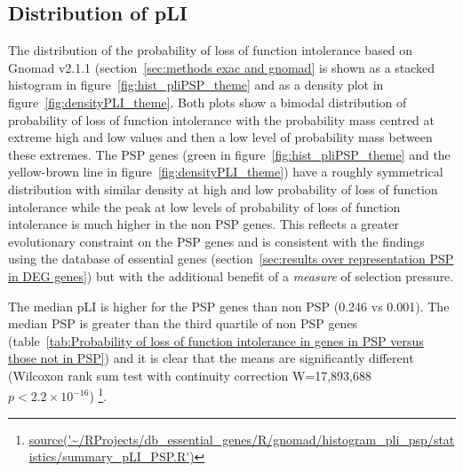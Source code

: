 \subsection{Distribution of pLI}
\label{sec:results distribution of pli}
The distribution of the probability of loss of function intolerance based on Gnomad v2.1.1 (section~\ref{sec:methods exac and gnomad} is shown as a stacked histogram in  figure~\ref{fig:hist_pliPSP_theme} and as a density plot in figure~\ref{fig:densityPLI_theme}. Both plots show a bimodal distribution of probability of loss of function intolerance with the probability mass centred at extreme high and low values and then a low level of probability mass between these extremes. The PSP genes (green in figure~\ref{fig:hist_pliPSP_theme} and the yellow-brown line in figure~\ref{fig:densityPLI_theme}) have a roughly symmetrical distribution with similar density at high and low probability of loss of function intolerance while the peak at low levels of probability of loss of function intolerance is much higher in the non PSP genes. This reflects a greater evolutionary constraint on the PSP genes and is consistent with the findings using the database of essential genes (section~\ref{sec:results over representation PSP in DEG genes}) but with the additional benefit of a \textit{measure} of selection pressure. 


The median pLI is higher for the PSP genes than non PSP (0.246 vs 0.001). The median PSP is greater than the third quartile of non PSP genes (table~\ref{tab:Probability of loss of function intolerance in genes in PSP versus those not in PSP}) and it is clear that the means are significantly different (Wilcoxon rank sum test with continuity correction W=17,893,688 $p<2.2\times10^{-16}$) \footnote{\url{source('~/RProjects/db_essential_genes/R/gnomad/histogram_pli_psp/statistics/summary_pLI_PSP.R')}}.


